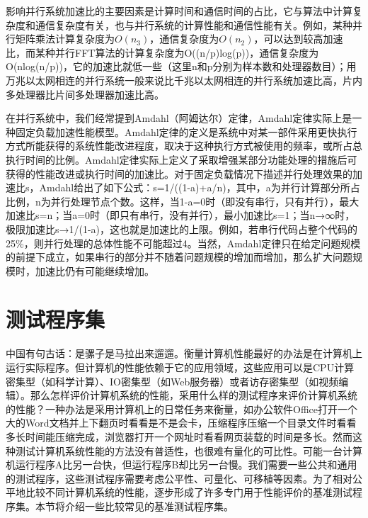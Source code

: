 \documentclass[]{ctexbook}
\begin{document}
影响并行系统加速比的主要因素是计算时间和通信时间的占比，它与算法中计算复杂度和通信复杂度有关，也与并行系统的计算性能和通信性能有关。例如，某种并行矩阵乘法计算复杂度为\(O(n_3)\)，通信复杂度为\(O(n_2)\)，可以达到较高加速比，而某种并行FFT算法的计算复杂度为O((n/p)log(p))，通信复杂度为O(nlog(n/p))，它的加速比就低一些（这里n和p分别为样本数和处理器数目）；用万兆以太网相连的并行系统一般来说比千兆以太网相连的并行系统加速比高，片内多处理器比片间多处理器加速比高。

在并行系统中，我们经常提到Amdahl（阿姆达尔）定律，Amdahl定律实际上是一种固定负载加速性能模型。Amdahl定律的定义是系统中对某一部件采用更快执行方式所能获得的系统性能改进程度，取决于这种执行方式被使用的频率，或所占总执行时间的比例。Amdahl定律实际上定义了采取增强某部分功能处理的措施后可获得的性能改进或执行时间的加速比。对于固定负载情况下描述并行处理效果的加速比s，Amdahl给出了如下公式：s=1/((1-a)+a/n)，其中，a为并行计算部分所占比例，n为并行处理节点个数。这样，当1-a=0时（即没有串行，只有并行），最大加速比s=n；当a=0时（即只有串行，没有并行），最小加速比s=1；当n→∞时，极限加速比s→1/(1-a)，这也就是加速比的上限。例如，若串行代码占整个代码的25\%，则并行处理的总体性能不可能超过4。当然，Amdahl定律只在给定问题规模的前提下成立，如果串行的部分并不随着问题规模的增加而增加，那么扩大问题规模时，加速比仍有可能继续增加。

\hypertarget{ux6d4bux8bd5ux7a0bux5e8fux96c6}{%
\section{测试程序集}\label{ux6d4bux8bd5ux7a0bux5e8fux96c6}}

中国有句古话：是骡子是马拉出来遛遛。衡量计算机性能最好的办法是在计算机上运行实际程序。但计算机的性能依赖于它的应用领域，这些应用可以是CPU计算密集型（如科学计算）、IO密集型（如Web服务器）或者访存密集型（如视频编辑）。那么怎样评价计算机系统的性能，采用什么样的测试程序来评价计算机系统的性能？一种办法是采用计算机上的日常任务来衡量，如办公软件Office打开一个大的Word文档并上下翻页时看看是不是会卡，压缩程序压缩一个目录文件时看看多长时间能压缩完成，浏览器打开一个网址时看看网页装载的时间是多长。然而这种测试计算机系统性能的方法没有普适性，也很难有量化的可比性。可能一台计算机运行程序A比另一台快，但运行程序B却比另一台慢。我们需要一些公共和通用的测试程序，这些测试程序需要考虑公平性、可量化、可移植等因素。为了相对公平地比较不同计算机系统的性能，逐步形成了许多专门用于性能评价的基准测试程序集。本节将介绍一些比较常见的基准测试程序集。
\end{document}
